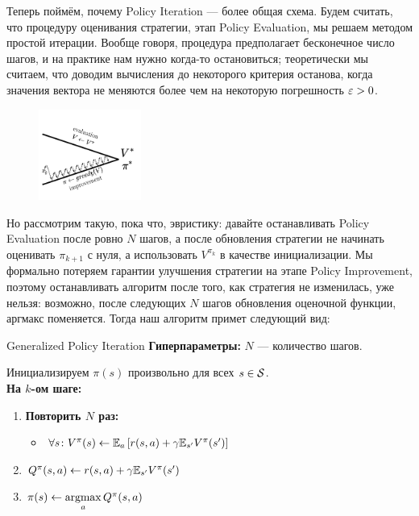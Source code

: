 Теперь поймём, почему Policy Iteration --- более общая схема. Будем считать, что процедуру оценивания стратегии, этап Policy Evaluation, мы решаем методом простой итерации. Вообще говоря, процедура предполагает бесконечное число шагов, и на практике нам нужно когда-то остановиться; теоретически мы считаем, что доводим вычисления до некоторого критерия останова, когда значения вектора не меняются более чем на некоторую погрешность $\varepsilon > 0$. 

\begin{figure}
\vspace{-1.2cm}
\centering
\includegraphics[width=0.3\textwidth]{Images/VI_basic.png}
\vspace{-1cm}
\end{figure}

Но рассмотрим такую, пока что, эвристику: давайте останавливать Policy Evaluation после ровно $N$ шагов, а после обновления стратегии не начинать оценивать $\pi_{k+1}$ с нуля, а использовать $V^{\pi_{k}}$ в качестве инициализации. Мы формально потеряем гарантии улучшения стратегии на этапе Policy Improvement, поэтому останавливать алгоритм после того, как стратегия не изменилась, уже нельзя: возможно, после следующих $N$ шагов обновления оценочной функции, аргмакс поменяется. Тогда наш алгоритм примет следующий вид: 

\begin{algorithm}[label=generalizedpolicyiteration]{Generalized Policy Iteration}
\textbf{Гиперпараметры:} $N$ --- количество шагов.

\vspace{0.3cm}
Инициализируем $\pi(s)$ произвольно для всех $s \in \mathcal{S}$. \\
\textbf{На $k$-ом шаге:}
\begin{enumerate}
    \item \textbf{Повторить $N$ раз:}
    \begin{itemize}
        \item $\forall s \colon V^{\pi}(s) \leftarrow \mathbb{E}_{a} \left[ r(s, a) + \gamma \mathbb{E}_{s'} V^{\pi}(s')\right]$
    \end{itemize}
    \item $Q^{\pi}(s, a) \leftarrow r(s, a) + \gamma \mathbb{E}_{s'} V^{\pi}(s')$
    \item $\pi(s) \leftarrow \mathop{\mathrm{argmax}}\limits_a Q^{\pi}(s, a)$
\end{enumerate}
\end{algorithm}

